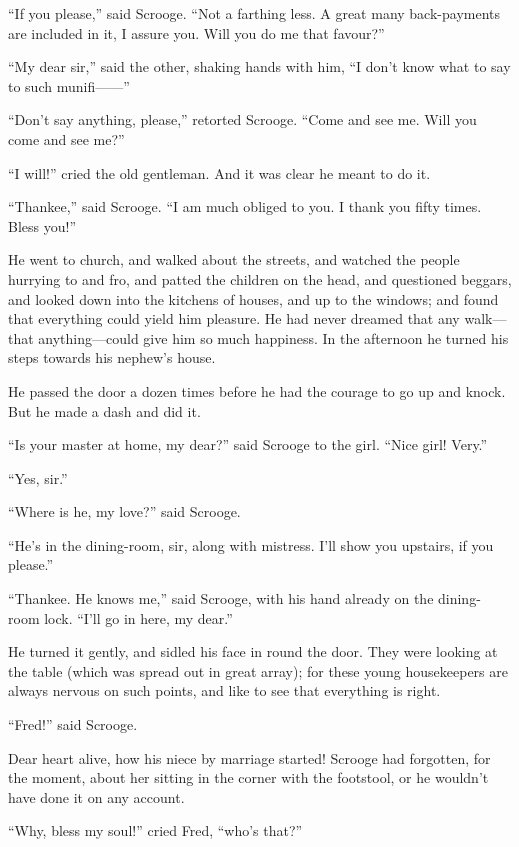 \documentclass[paper=5.5in:8.5in,BCOR=15mm,twoside,DIV=15,headinclude=off,12pt,chapterprefix=off,openany,headings=huge]{scrbook} %
\begin{document}
\enquote{If you please,} said Scrooge. \enquote{Not a farthing less. A great many back-payments are included in it, I assure you. Will you do me that favour?}

\enquote{My dear sir,} said the other, shaking hands with him, \enquote{I don't know what to say to such munifi——}

\enquote{Don't say anything, please,} retorted Scrooge. \enquote{Come and see me. Will you come and see me?}

\enquote{I will!} cried the old gentleman. And it was clear he meant to do it.

\enquote{Thankee,} said Scrooge. \enquote{I am much obliged to you. I thank you fifty times. Bless you!}

He went to church, and walked about the streets, and watched the people hurrying to and fro, and patted the children on the head, and questioned beggars, and looked down into the kitchens of houses, and up to the windows; and found that everything could yield him pleasure. He had never dreamed that any walk—that anything—could give him so much happiness. In the afternoon he turned his steps towards his nephew's house.

He passed the door a dozen times before he had the courage to go up and knock. But he made a dash and did it.

\enquote{Is your master at home, my dear?} said Scrooge to the girl. \enquote{Nice girl! Very.}

\enquote{Yes, sir.}

\enquote{Where is he, my love?} said Scrooge.

\enquote{He's in the dining-room, sir, along with mistress. I'll show you upstairs, if you please.}

\enquote{Thankee. He knows me,} said Scrooge, with his hand already on the dining-room lock. \enquote{I'll go in here, my dear.}

He turned it gently, and sidled his face in round the door. They were looking at the table (which was spread out in great array); for these young housekeepers are always nervous on such points, and like to see that everything is right.

\enquote{Fred!} said Scrooge.

Dear heart alive, how his niece by marriage started! Scrooge had forgotten, for the moment, about her sitting in the corner with the footstool, or he wouldn't have done it on any account.

\enquote{Why, bless my soul!} cried Fred, \enquote{who's that?}
\end{document}
